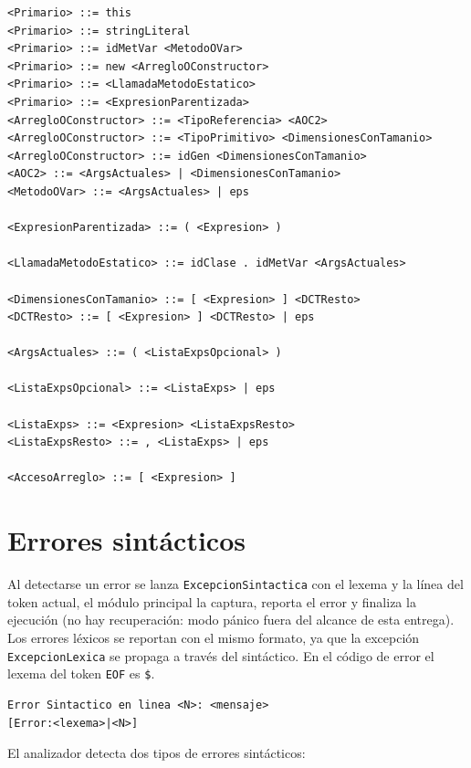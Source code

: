 \documentclass[11pt,a4paper]{article}
\begin{document}
{\begin{verbatim}
<Primario> ::= this
<Primario> ::= stringLiteral
<Primario> ::= idMetVar <MetodoOVar>
<Primario> ::= new <ArregloOConstructor>
<Primario> ::= <LlamadaMetodoEstatico>
<Primario> ::= <ExpresionParentizada>
<ArregloOConstructor> ::= <TipoReferencia> <AOC2>
<ArregloOConstructor> ::= <TipoPrimitivo> <DimensionesConTamanio>
<ArregloOConstructor> ::= idGen <DimensionesConTamanio>
<AOC2> ::= <ArgsActuales> | <DimensionesConTamanio>
<MetodoOVar> ::= <ArgsActuales> | eps

<ExpresionParentizada> ::= ( <Expresion> )

<LlamadaMetodoEstatico> ::= idClase . idMetVar <ArgsActuales>

<DimensionesConTamanio> ::= [ <Expresion> ] <DCTResto>
<DCTResto> ::= [ <Expresion> ] <DCTResto> | eps

<ArgsActuales> ::= ( <ListaExpsOpcional> )

<ListaExpsOpcional> ::= <ListaExps> | eps

<ListaExps> ::= <Expresion> <ListaExpsResto>
<ListaExpsResto> ::= , <ListaExps> | eps

<AccesoArreglo> ::= [ <Expresion> ]
\end{verbatim}
}

\section{Errores sintácticos}

Al detectarse un error se lanza \texttt{ExcepcionSintactica} con el lexema y la línea del
token actual, el módulo principal la captura, reporta el error y finaliza la ejecución (no
hay recuperación: modo pánico fuera del alcance de esta entrega). Los errores léxicos se
reportan con el mismo formato, ya que la excepción \texttt{ExcepcionLexica} se propaga a
través del sintáctico. En el código de error el lexema del token \texttt{EOF} es
\verb!$!.

\begin{verbatim}
Error Sintactico en linea <N>: <mensaje>
[Error:<lexema>|<N>]
\end{verbatim}

El analizador detecta dos tipos de errores sintácticos:
\end{document}
